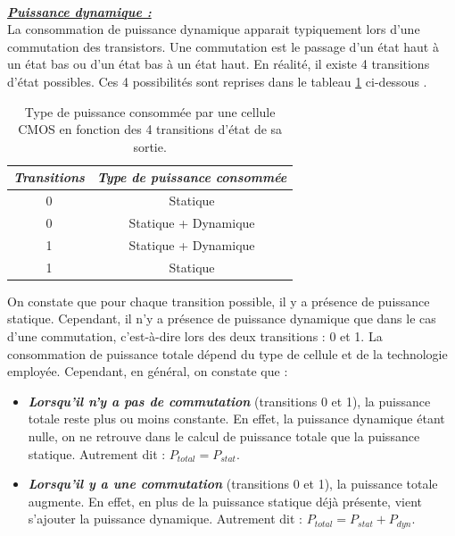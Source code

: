 \documentclass[oneside]{book}
\begin{document}
\hspace{-0.5 cm}
\vspace{0.6 cm} \\
\hspace{-0.5 cm}\underline{\textbf{\textit{Puissance dynamique :}}} \vspace{0.2 cm} \\
La consommation de puissance dynamique apparait typiquement lors d'une commutation des transistors. Une commutation est le passage d'un état haut à un état bas ou d'un état bas à un état haut. En réalité, il existe 4 transitions d'état possibles. Ces 4 possibilités sont reprises dans le tableau \ref{fig:dyn} ci-dessous \cite{mangard_power_2007}. 
\begin{table}[htbp]
	\centering
	\begin{tabular}{|c|c|}
    		\hline
   		  \textit{Transitions} & \textit{Type de puissance consommée} \\ \hline 
   		  0  \rightarrow 0 & Statique \\ 
   		  0  \rightarrow 1 & Statique + Dynamique \\ 
		  1  \rightarrow 0 & Statique + Dynamique \\ 
   		  1  \rightarrow 1 & Statique \\ \hline
	\end{tabular}
    	\caption{Type de puissance consommée par une cellule CMOS en fonction des 4 transitions d'état de sa sortie.}
    	\label{fig:dyn} 
\end{table}

\hspace{-0.5 cm}On constate que pour chaque transition possible, il y a présence de puissance statique. Cependant, il n'y a présence de puissance dynamique que dans le cas d'une commutation, c'est-à-dire lors des deux transitions : 0 et 1.  La consommation de puissance totale dépend du type de cellule et de la technologie employée. Cependant, en général, on constate que : 
\begin{itemize}
\item \textbf{\textit{Lorsqu'il n'y a pas de commutation}} (transitions 0 et 1), la puissance totale reste plus ou moins constante. En effet, la puissance dynamique étant nulle, on ne retrouve dans le calcul de puissance totale que la puissance statique. Autrement dit : $P_{total}=P_{stat}$.
\item \textbf{\textit{Lorsqu'il y a une commutation}} (transitions 0 et 1), la puissance totale augmente. En effet, en plus de la puissance statique déjà présente, vient s'ajouter la puissance dynamique. Autrement dit : $P_{total}=P_{stat}+P_{dyn}$.
\end{itemize}
\end{document}
